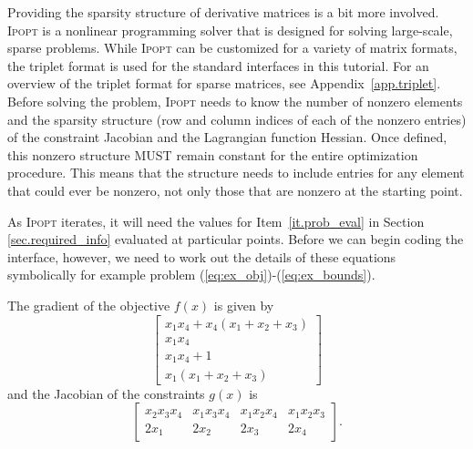 \documentclass[10pt]{article}
\newcommand{\Ipopt}{\textsc{Ipopt}\xspace}
\begin{document}
Providing the sparsity structure of derivative matrices is a bit more
involved. \Ipopt is a nonlinear programming solver that is designed
for solving large-scale, sparse problems. While \Ipopt can be
customized for a variety of matrix formats, the triplet format is used
for the standard interfaces in this tutorial. For an overview of the
triplet format for sparse matrices, see Appendix~\ref{app.triplet}.
Before solving the problem, \Ipopt needs to know the number of
nonzero elements and the sparsity structure (row and column indices of
each of the nonzero entries) of the constraint Jacobian and the
Lagrangian function Hessian. Once defined, this nonzero structure MUST
remain constant for the entire optimization procedure. This means that
the structure needs to include entries for any element that could ever
be nonzero, not only those that are nonzero at the starting point.

As \Ipopt iterates, it will need the values for
Item~\ref{it.prob_eval} in Section \ref{sec.required_info} evaluated at
particular points. Before we can begin coding the interface, however,
we need to work out the details of these equations symbolically for
example problem (\ref{eq:ex_obj})-(\ref{eq:ex_bounds}).

The gradient of the objective $f(x)$ is given by
\[
\left[
\begin{array}{c}
x_1 x_4 + x_4 (x_1 + x_2 + x_3) \\
x_1 x_4 \\
x_1 x_4 + 1 \\
x_1 (x_1 + x_2 + x_3)
\end{array}
\right]
\]
and the Jacobian of the constraints $g(x)$ is
\[
\left[
\begin{array}{cccc}
x_2 x_3 x_4     & x_1 x_3 x_4   & x_1 x_2 x_4   & x_1 x_2 x_3   \\
2 x_1           & 2 x_2         & 2 x_3         & 2 x_4
\end{array}
\right].
\]
\end{document}
